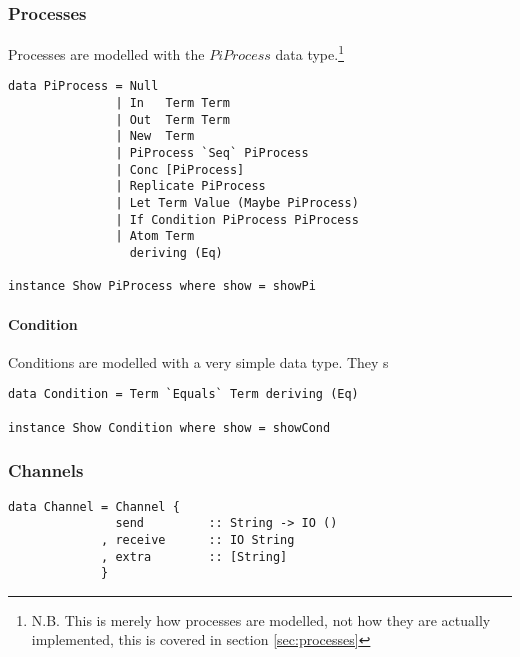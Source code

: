 \subsubsection{Processes}

Processes are modelled with the $PiProcess$ data type.\footnote{N.B. This is merely how processes are modelled, not how they are actually implemented, this is covered in section \ref{sec:processes}}

\begin{verbatim}
data PiProcess = Null
               | In   Term Term
               | Out  Term Term
               | New  Term
               | PiProcess `Seq` PiProcess 
               | Conc [PiProcess]          
               | Replicate PiProcess       
               | Let Term Value (Maybe PiProcess)
               | If Condition PiProcess PiProcess
               | Atom Term
                 deriving (Eq)

instance Show PiProcess where show = showPi
\end{verbatim}



\paragraph{Condition}

Conditions are modelled with a very simple data type. They s

\begin{verbatim}
data Condition = Term `Equals` Term deriving (Eq)

instance Show Condition where show = showCond

\end{verbatim}

\subsubsection{Channels}
\begin{verbatim}
data Channel = Channel {
               send         :: String -> IO ()
             , receive      :: IO String
             , extra        :: [String]
             }
\end{verbatim}
